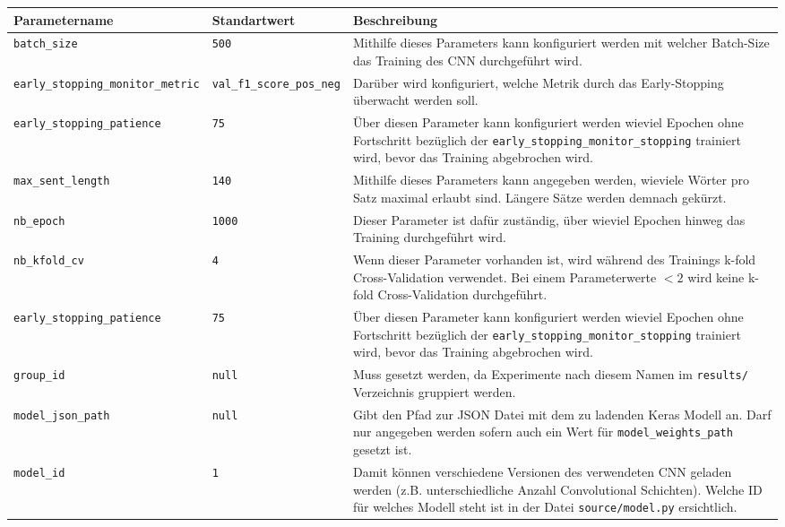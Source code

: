 \begin{appendices}
\begin{table}[H]
  \centering
  \begin{adjustbox}{max width=\textwidth, max height=\textheight}
    \begin{tabular}{@{}l|l|p{10cm}@{}}
      \toprule
      Parametername & Standartwert & Beschreibung\\ \midrule
      \texttt{batch{\_}size} & \texttt{500} & Mithilfe dieses Parameters kann konfiguriert werden mit welcher Batch-Size das Training des CNN durchgeführt wird.\\
      \texttt{early{\_}stopping{\_}monitor{\_}metric} & \texttt{val{\_}f1{\_}score{\_}pos{\_}neg} & Darüber wird konfiguriert, welche Metrik durch das Early-Stopping überwacht werden soll.\\
      \texttt{early{\_}stopping{\_}patience} & \texttt{75} & Über diesen Parameter kann konfiguriert werden wieviel Epochen ohne Fortschritt bezüglich der \texttt{early{\_}stopping{\_}monitor{\_}stopping} trainiert wird, bevor das Training abgebrochen wird.\\
      \texttt{max{\_}sent{\_}length} & \texttt{140} & Mithilfe dieses Parameters kann angegeben werden, wieviele Wörter pro Satz maximal erlaubt sind. Längere Sätze werden demnach gekürzt.\\
      \texttt{nb{\_}epoch} & \texttt{1000} & Dieser Parameter ist dafür zuständig, über wieviel Epochen hinweg das Training durchgeführt wird.\\
      \texttt{nb{\_}kfold{\_}cv} & \texttt{4} & Wenn dieser Parameter vorhanden ist, wird während des Trainings k-fold Cross-Validation verwendet. Bei einem Parameterwerte $< 2$ wird keine k-fold Cross-Validation durchgeführt.\\
      \texttt{early{\_}stopping{\_}patience} & \texttt{75} & Über diesen Parameter kann konfiguriert werden wieviel Epochen ohne Fortschritt bezüglich der \texttt{early{\_}stopping{\_}monitor{\_}stopping} trainiert wird, bevor das Training abgebrochen wird.\\
      \texttt{group{\_}id} & \texttt{null} & Muss gesetzt werden, da Experimente nach diesem Namen im \texttt{results/} Verzeichnis gruppiert werden.\\
      \texttt{model{\_}json{\_}path} & \texttt{null} & Gibt den Pfad zur JSON Datei mit dem zu ladenden Keras Modell an. Darf nur angegeben werden sofern auch ein Wert für \texttt{model{\_}weights{\_}path} gesetzt ist.\\
      \texttt{model{\_}id} & \texttt{1} & Damit können verschiedene Versionen des verwendeten CNN geladen werden (z.B. unterschiedliche Anzahl Convolutional Schichten). Welche ID für welches Modell steht ist in der Datei \texttt{source/model.py} ersichtlich.\\

\end{tabular}
\end{adjustbox}
\end{table}
\end{appendices}
